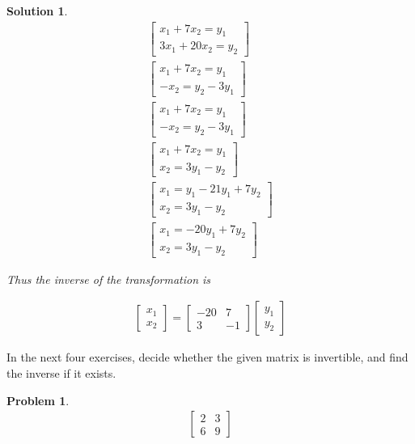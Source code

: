 \documentclass{article}
\newtheorem{problem}{Problem}
\newtheorem*{solution}{Solution}
\begin{document}
\begin{solution}
\begin{align*}
\begin{bmatrix}
x_{1} + 7x_{2} = y_{1} \\
3x_{1} + 20x_{2} = y_{2}
\end{bmatrix} \\
\begin{bmatrix}
x_{1} + 7x_{2} = y_{1} \\
-x_{2} = y_{2} - 3y_{1}
\end{bmatrix} \\
\begin{bmatrix}
x_{1} + 7x_{2} = y_{1} \\
-x_{2} = y_{2} - 3y_{1}
\end{bmatrix} \\
\begin{bmatrix}
x_{1} + 7x_{2} = y_{1} \\
x_{2} = 3y_{1} - y_{2}
\end{bmatrix} \\
\begin{bmatrix}
x_{1} = y_{1} - 21y_{1} + 7y_{2} \\
x_{2} = 3y_{1} - y_{2}
\end{bmatrix} \\
\begin{bmatrix}
x_{1} = -20y_{1} + 7y_{2} \\
x_{2} = 3y_{1} - y_{2}
\end{bmatrix} 
\end{align*}

Thus the inverse of the transformation is 

\begin{align*}
\begin{bmatrix} x_{1} \\ x_{2} \end{bmatrix} = \begin{bmatrix}-20 & 7 \\ 3 & -1 \end{bmatrix} \begin{bmatrix} y_{1} \\ y_{2} \end{bmatrix}
\end{align*}
\end{solution}

In the next four exercises, decide whether the given matrix is invertible, and find the inverse if it exists.

\begin{problem}
\begin{align*}
\begin{bmatrix}
2 & 3 \\ 6 & 9
\end{bmatrix}
\end{align*}
\end{problem}
\end{document}
